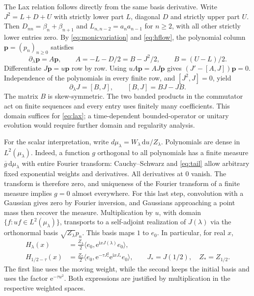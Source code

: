 \documentclass[11pt]{article}
\numberwithin{equation}{section}
\newcommand{\e}{\mathrm e}
\newcommand{\ii}{\mathrm i}
\newcommand{\dd}{\mathrm d}
\begin{document}
The Lax relation follows directly from the same basis derivative.
Write \(J^2=L+D+U\) with strictly lower part \(L\), diagonal \(D\)
and strictly upper part \(U\). Then
\(D_{nn}=\beta_n+\beta_{n+1}\) and
\(L_{n,n-2}=a_n a_{n-1}\) for \(n\ge2\), with all other strictly
lower entries zero. By \eqref{eq:monicvariation} and \eqref{eq:hflow},
the polynomial column \(\boldsymbol p=(p_n)_{n\ge0}\) satisfies
\[
 \partial_\lambda\boldsymbol p=A\boldsymbol p,\qquad
 A=-L-D/2=B-J^2/2,\qquad B=(U-L)/2 .
\]
Differentiate \(J\boldsymbol p=u\boldsymbol p\) row by row.
Using \(u A\boldsymbol p=A J\boldsymbol p\) gives
\((J'-[A,J])\boldsymbol p=0\).
Independence of the polynomials in every finite row, and
\([J^2,J]=0\), yield
\begin{equation}
 \partial_\lambda J=[B,J],\qquad [B,J]=BJ-JB .
 \label{eq:lax}
\end{equation}
The matrix \(B\) is skew-symmetric. The two banded products in the
commutator act on finite sequences and every entry uses finitely
many coefficients. This domain suffices for \eqref{eq:lax}; a
time-dependent bounded-operator or unitary evolution would require
further domain and regularity analysis.

For the scalar interpretation, write \(d\mu_\lambda=W_\lambda\,\dd u/Z_\lambda\).
Polynomials are dense in \(L^2(\mu_\lambda)\). Indeed, a function
\(g\) orthogonal to all polynomials has a finite measure
\(\overline g\,\dd\mu_\lambda\) with entire Fourier transform:
Cauchy--Schwarz and \eqref{eq:tail} allow arbitrary fixed exponential
weights and derivatives. All derivatives at \(0\) vanish. The
transform is therefore zero, and uniqueness of the Fourier transform
of a finite measure implies \(g=0\) almost everywhere. For this last
step, convolution with a Gaussian gives zero by Fourier inversion,
and Gaussians approaching a point mass then recover the measure.
Multiplication by \(u\), with domain
\(\{f:uf\in L^2(\mu_\lambda)\}\), transports to a self-adjoint
realization of \(J(\lambda)\) via the orthonormal basis
\(\sqrt{Z_\lambda}p_n\). This basis maps \(1\) to \(e_0\).
In particular, for real \(x\),
\begin{equation}
 \begin{aligned}
 H_\lambda(x)&=\frac{Z_\lambda}{2}
       \langle e_0,\e^{\ii xJ(\lambda)} e_0\rangle,\\
 H_{1/2-\tau}(x)&=\frac{Z_*}{2}
       \langle e_0,\e^{-\tau J_*^2}\e^{\ii xJ_*} e_0\rangle,
       \qquad J_*=J(1/2),\quad Z_*=Z_{1/2}.
 \end{aligned}
 \label{eq:twochains}
\end{equation}
The first line uses the moving weight, while the second keeps the
initial basis and uses the factor \(\e^{-\tau u^2}\).
Both expressions are justified by multiplication in the respective
weighted spaces.
\end{document}
